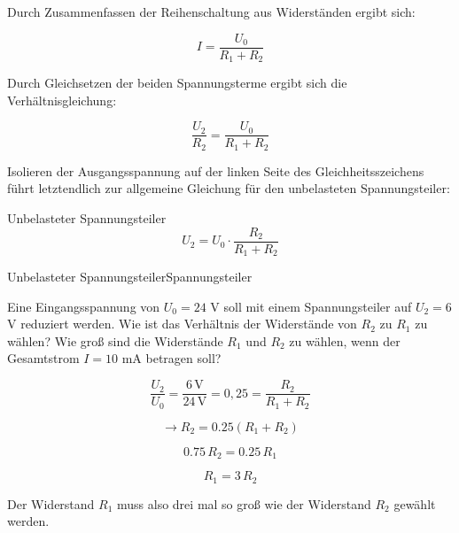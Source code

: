 \begin{frame}
{Durch Zusammenfassen der Reihenschaltung aus Widerständen ergibt sich:

\begin{equation*}
	I = \frac{U_0}{R_1+R_2}
\end{equation*}

Durch Gleichsetzen der beiden Spannungsterme ergibt sich die Verhältnisgleichung: 



\begin{equation*}
	\frac{U_2}{R_2} = \frac{U_0}{R_1+R_2}
\end{equation*}

Isolieren der Ausgangsspannung auf der linken Seite des Gleichheitsszeichens führt letztendlich 
zur allgemeine Gleichung für den unbelasteten Spannungsteiler:

\begin{Merksatz}{Unbelasteter Spannungsteiler}
	\begin{equation}
		U_2 = U_0 \cdot \frac{R_2}{R_1+R_2}
	\end{equation}
\end{Merksatz}


\begin{bsp}{Unbelasteter Spannungsteiler}{Spannungsteiler}

Eine Eingangsspannung von $U_0 = 24$ V soll mit einem Spannungsteiler auf $U_2 = 6$ V reduziert werden.
Wie ist das Verhältnis der Widerstände von $R_2$ zu $R_1$ zu wählen?
Wie groß sind die Widerstände $R_1$ und $R_2$ zu wählen, wenn der Gesamtstrom $I = 10$ mA betragen soll?

\begin{equation*}
	\frac{U_2}{U_0} = \frac{6 \, \mathrm{V}}{24 \, \mathrm{V}} = 0,25 = \frac{R_2}{R_1+R_2}
\end{equation*}

\begin{equation*}
	\rightarrow R_2 = 0.25 (R_1+R_2)  
\end{equation*}

\begin{equation*}
	0.75 \, R_2 = 0.25 \, R_1
\end{equation*}

\begin{equation*}
	R_1 = 3 \, R_2
\end{equation*}


Der Widerstand $R_1$ muss also drei mal so groß wie der Widerstand $R_2$ gewählt werden.\\




\end{bsp}}
\end{frame}

